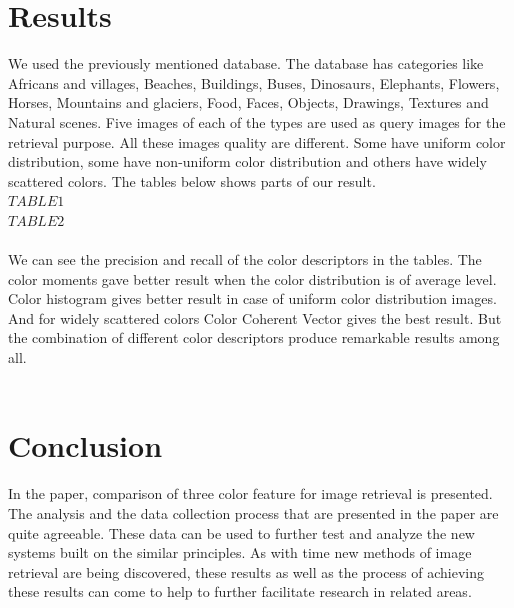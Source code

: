 \documentclass[pstricks,10pt]{report}
\begin{document}
\section{Results}
We used the previously mentioned database. The database has categories like  Africans and villages, Beaches, Buildings, Buses, Dinosaurs, Elephants, Flowers, Horses, Mountains and glaciers, Food, Faces, Objects, Drawings, Textures and Natural scenes. Five images of each of the types are used as query images for the retrieval purpose. All these images quality are different. Some have uniform color distribution, some have non-uniform color distribution and others have widely scattered colors. The tables below shows parts of our result.\\
$TABLE1$\\
$TABLE2$\\
\\
We can see the precision and recall of the color descriptors in the tables. The color moments gave better result when the color distribution is of average level. Color histogram gives better result in case of uniform color distribution images. And for widely scattered colors Color Coherent Vector gives the best result. But the combination of different color descriptors produce remarkable results among all.\\
\\
\section{Conclusion}
In the paper, comparison of three color feature for image retrieval is presented. The analysis and the data collection process that are presented in the paper are quite agreeable. These data can be used to further test and analyze the new systems built on the similar principles. As with time new methods of image retrieval are being discovered, these results as well as the process of achieving these results can come to help to further facilitate research in related areas.
\end{document}
